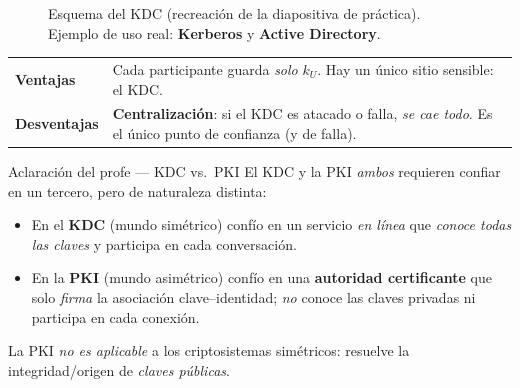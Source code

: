 \documentclass[11pt,a4paper]{article}
\newcommand{\enc}[2]{\{#1\}\,#2}          %
\begin{document}
\begin{figure}[h]
\centering
{}
\caption{Esquema del KDC (recreación de la diapositiva de práctica). Ejemplo de uso real:
\textbf{Kerberos} y \textbf{Active Directory}.}
\end{figure}

\begin{center}
\renewcommand{\arraystretch}{1.25}
\begin{tabular}{>{\bfseries}p{3.2cm} p{10.2cm}}
\toprule
\textcolor{practGreen}{Ventajas} & Cada participante guarda \emph{solo} $k_U$. Hay un único sitio sensible: el KDC.\\
\textcolor{attackRed}{Desventajas} & \textbf{Centralización}: si el KDC es atacado o falla, \emph{se cae todo}. Es el único punto de confianza (y de falla).\\
\bottomrule
\end{tabular}
\end{center}

\begin{practbox}{Aclaración del profe — KDC vs.\ PKI}
El KDC y la PKI \emph{ambos} requieren confiar en un tercero, pero de naturaleza distinta:
\begin{itemize}[leftmargin=1.4em,itemsep=1pt]
  \item En el \textbf{KDC} (mundo simétrico) confío en un servicio \emph{en línea} que
        \emph{conoce todas las claves} y participa en cada conversación.
  \item En la \textbf{PKI} (mundo asimétrico) confío en una \textbf{autoridad certificante}
        que solo \emph{firma} la asociación clave--identidad; \emph{no} conoce las claves
        privadas ni participa en cada conexión.
\end{itemize}
La PKI \emph{no es aplicable} a los criptosistemas simétricos: resuelve la integridad/origen
de \emph{claves públicas}.
\end{practbox}
\end{document}
